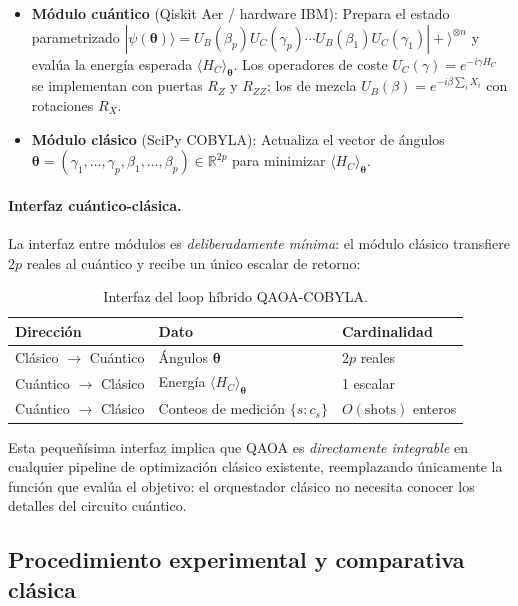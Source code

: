 \begin{itemize}
  \item \textbf{Módulo cuántico} (Qiskit Aer / hardware IBM): Prepara el estado parametrizado $|\psi(\boldsymbol{\theta})\rangle = U_B(\beta_p)U_C(\gamma_p)\cdots U_B(\beta_1)U_C(\gamma_1)|+\rangle^{\otimes n}$ y evalúa la energía esperada $\langle H_C \rangle_{\boldsymbol{\theta}}$. Los operadores de coste $U_C(\gamma) = e^{-i\gamma H_C}$ se implementan con puertas $R_Z$ y $R_{ZZ}$; los de mezcla $U_B(\beta) = e^{-i\beta \sum_i X_i}$ con rotaciones $R_X$.
  \item \textbf{Módulo clásico} (SciPy COBYLA): Actualiza el vector de ángulos $\boldsymbol{\theta} = (\gamma_1, \ldots, \gamma_p, \beta_1, \ldots, \beta_p) \in \mathbb{R}^{2p}$ para minimizar $\langle H_C \rangle_{\boldsymbol{\theta}}$.
\end{itemize}

\paragraph{Interfaz cuántico-clásica.}
La interfaz entre módulos es \textit{deliberadamente mínima}: el módulo clásico transfiere $2p$ reales al cuántico y recibe un único escalar de retorno:

\begin{table}[ht]
\centering
\caption{Interfaz del loop híbrido QAOA-COBYLA.}
\label{tab:interfaz_hibrida}
\begin{tabular}{lll}
\hline
\textbf{Dirección} & \textbf{Dato} & \textbf{Cardinalidad} \\
\hline
Clásico $\rightarrow$ Cuántico & Ángulos $\boldsymbol{\theta}$ & $2p$ reales \\
Cuántico $\rightarrow$ Clásico & Energía $\langle H_C \rangle_{\boldsymbol{\theta}}$ & 1 escalar \\
Cuántico $\rightarrow$ Clásico & Conteos de medición $\{s: c_s\}$ & $O(\text{shots})$ enteros \\
\hline
\end{tabular}
\end{table}

Esta pequeñísima interfaz implica que QAOA es \textit{directamente integrable} en cualquier pipeline de optimización clásico existente, reemplazando únicamente la función que evalúa el objetivo: el orquestador clásico no necesita conocer los detalles del circuito cuántico.

\subsection{Procedimiento experimental y comparativa clásica}

